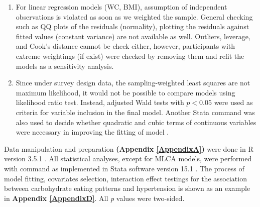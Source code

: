 \begin{enumerate}
	\item For linear regression models (WC, BMI), assumption of independent observations is violated as soon as we weighted the sample. General checking such as QQ plots of the residuals (normality), plotting the residuals against fitted values (constant variance) are not available as well. Outliers, leverage, and Cook's distance cannot be check either, however, participants with extreme weightings (if exist) were checked by removing them and refit the models as a sensitivity analysis.
	\item Since under survey design data, the sampling-weighted least squares are not maximum likelihood, it would not be possible to compare models using likelihood ratio test. Instead, adjusted Wald tests with $p < 0.05$ were used as criteria for variable inclusion in the final model. Another Stata command  was also used to  decide whether quadratic and cubic terms of continuous variables were necessary in improving the fitting of model \parencite{pregibon1980goodness}. 
\end{enumerate}

Data manipulation and preparation \textbf{(Appendix \ref{AppendixA})} were done in R version 3.5.1 \parencite{R3.5.1}. All statistical analyses, except for MLCA models, were performed with  command as implemented in Stata software version 15.1 \parencite{stata15}. The process of model fitting, covariates selection, interaction effect testings for the association between carbohydrate eating patterns and hypertension is shown as an example in \textbf{Appendix \ref{AppendixD}}. All \textit{p} values were two-sided.
